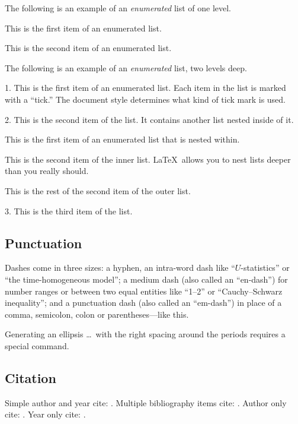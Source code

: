 \documentclass[aoas,preprint]{imsart}
\theoremstyle{remark}
\begin{document}
The following is an example of an \emph{enumerated} list of one level.

\begin{longlist}
\item This is the first item of an enumerated list.
\item This is the second item of an enumerated list.
\end{longlist}

The following is an example of an \emph{enumerated} list, two levels deep.
\begin{longlist}
\item[1.]
This is the first item of an enumerated list.  Each item
in the list is marked with a ``tick.''  The document
style determines what kind of tick mark is used.
\item[2.]
This is the second item of the list.  It contains another
list nested inside of it.
\begin{longlist}
\item
This is the first item of an enumerated list that
is nested within.  
\item
This is the second item of the inner list.  \LaTeX\
allows you to nest lists deeper than you really should.
\end{longlist}
This is the rest of the second item of the outer list.
\item[3.]
This is the third item of the list.
\end{longlist}

\subsection{Punctuation}
Dashes come in three sizes: a hyphen, an intra-word dash like ``$U$-statistics'' or ``the time-homogeneous model'';
a medium dash (also called an ``en-dash'') for number ranges or between two equal entities like ``1--2'' or ``Cauchy--Schwarz inequality'';
and a punctuation dash (also called an ``em-dash'') in place of a comma, semicolon,
colon or parentheses---like this.

Generating an ellipsis \ldots\ with the right spacing
around the periods requires a special command.

\subsection{Citation}

Simple author and year cite: \cite{r1}.
Multiple bibliography items cite: \cite{r1,r2}.
Author only cite: \citeauthor{r3}.
Year only cite: \citeyear{r4}.
\end{document}
